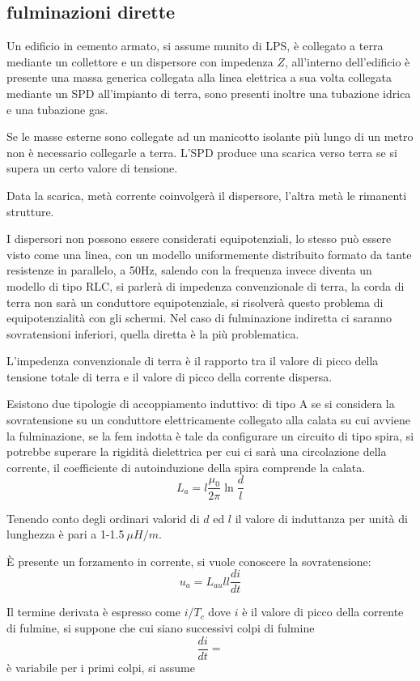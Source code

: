 
\subsection{fulminazioni dirette}
Un edificio in cemento armato, si assume munito di LPS, è collegato a terra 
mediante un collettore e un dispersore con impedenza $Z$, all'interno 
dell'edificio è presente una massa generica collegata alla linea elettrica a 
sua volta collegata mediante un SPD all'impianto di terra, sono presenti 
inoltre una tubazione idrica e una tubazione gas.

Se le masse esterne sono collegate ad un manicotto isolante più lungo di un 
metro non è necessario collegarle a terra. L'SPD produce una scarica verso 
terra se si supera un certo valore di tensione.

Data la scarica, metà corrente coinvolgerà il dispersore, l'altra metà le 
rimanenti strutture.

I dispersori non possono essere considerati equipotenziali, lo stesso può 
essere visto come una linea, con un modello uniformemente distribuito formato 
da tante resistenze in parallelo, a 50Hz, salendo con la frequenza invece 
diventa un modello di tipo RLC, si parlerà di impedenza convenzionale di terra, 
la corda di terra non sarà un conduttore equipotenziale, si risolverà questo 
problema di equipotenzialità con gli schermi. Nel caso di fulminazione 
indiretta ci saranno sovratensioni inferiori, quella diretta è la più 
problematica.

L'impedenza convenzionale di terra è il rapporto tra il valore di picco della tensione totale di terra e il valore di picco della corrente dispersa.

Esistono due tipologie di accoppiamento induttivo: di tipo A se si considera la 
sovratensione su un conduttore elettricamente collegato alla calata su cui 
avviene la fulminazione, se la fem indotta è tale da configurare un circuito di 
tipo spira, si potrebbe superare la rigidità dielettrica per cui ci sarà una 
circolazione della corrente, il coefficiente di autoinduzione della spira 
comprende la calata.
$$
L_a = l\frac{\mu_0}{2\pi} \ln \frac{d}{l}
$$

Tenendo conto degli ordinari valorid di $d$ ed $l$ il valore di induttanza per unità di lunghezza è pari a 1-1.5$\ \mu H/m$.

È presente un forzamento in corrente, si vuole conoscere la sovratensione:
$$
u_a = L_{au} ll\frac{di}{dt}
$$

Il termine derivata è espresso come $i/T_c$ dove $i$ è il valore di picco della corrente di fulmine,
si suppone che cui siano successivi colpi di fulmine
$$
\frac{di}{dt} = 
$$
è variabile per i primi colpi, si assume 

